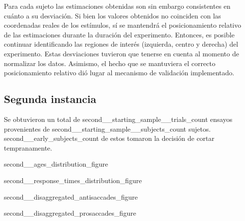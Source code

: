 Para cada sujeto las estimaciones obtenidas son sin embargo consistentes en
cuánto a su desviación. Si bien los valores obtenidos no coinciden con las
coordenadas reales de los estímulos, sí se mantendrá el posicionamiento
relativo de las estimaciones durante la duración del experimento. Entonces, es
posible continuar identificando las regiones de interés (izquierda, centro y
derecha) del experimento. Estas desviaciones tuvieron que tenerse en cuenta al
momento de normalizar los datos. Asimismo, el hecho que se mantuviera el
correcto posicionamiento relativo dió lugar al mecanismo de validación
implementado.


\subsection{{Segunda instancia}}

Se obtuvieron un total de {second__starting_sample__trials_count} ensayos
provenientes de {second__starting_sample__subjects_count} sujetos.
{second__early_subjects_count} de estos tomaron la decisión de cortar
tempranamente.



{second__ages_distribution_figure}

{second__response_times_distribution_figure}

{second__disaggregated_antisaccades_figure}

{second__disaggregated_prosaccades_figure}
